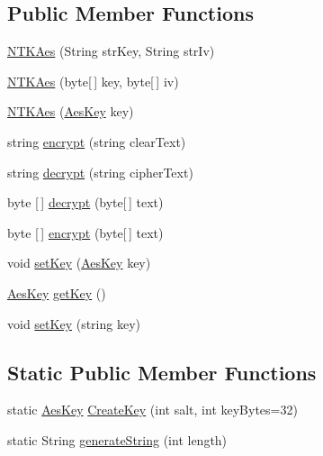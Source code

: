 \subsection*{Public Member Functions}
\begin{DoxyCompactItemize}
\item 
\mbox{\hyperlink{class_n_t_k_1_1_security_1_1_n_t_k_aes_a68f8ea8c2559da1a7d2a3d1677145cd1}{N\+T\+K\+Aes}} (String str\+Key, String str\+Iv)
\item 
\mbox{\hyperlink{class_n_t_k_1_1_security_1_1_n_t_k_aes_a9dca3e66e70f494151ffe863b0e2fd31}{N\+T\+K\+Aes}} (byte\mbox{[}$\,$\mbox{]} key, byte\mbox{[}$\,$\mbox{]} iv)
\item 
\mbox{\hyperlink{class_n_t_k_1_1_security_1_1_n_t_k_aes_a961f23c2649d2f56dedb0db5d9e394db}{N\+T\+K\+Aes}} (\mbox{\hyperlink{struct_n_t_k_1_1_security_1_1_aes_key}{Aes\+Key}} key)
\item 
string \mbox{\hyperlink{class_n_t_k_1_1_security_1_1_n_t_k_aes_aafd754f5643c47dc53dfbf7d482556ce}{encrypt}} (string clear\+Text)
\item 
string \mbox{\hyperlink{class_n_t_k_1_1_security_1_1_n_t_k_aes_a4f70eed096e2d3e59c4a848f66289371}{decrypt}} (string cipher\+Text)
\item 
byte \mbox{[}$\,$\mbox{]} \mbox{\hyperlink{class_n_t_k_1_1_security_1_1_n_t_k_aes_a103d6e749268165cca16c0375497a702}{decrypt}} (byte\mbox{[}$\,$\mbox{]} text)
\item 
byte \mbox{[}$\,$\mbox{]} \mbox{\hyperlink{class_n_t_k_1_1_security_1_1_n_t_k_aes_ad9da3eba89f2724ebe54e63086cee810}{encrypt}} (byte\mbox{[}$\,$\mbox{]} text)
\item 
void \mbox{\hyperlink{class_n_t_k_1_1_security_1_1_n_t_k_aes_a19733b3d2a0c97fdc2a8a86767954cfc}{set\+Key}} (\mbox{\hyperlink{struct_n_t_k_1_1_security_1_1_aes_key}{Aes\+Key}} key)
\item 
\mbox{\hyperlink{struct_n_t_k_1_1_security_1_1_aes_key}{Aes\+Key}} \mbox{\hyperlink{class_n_t_k_1_1_security_1_1_n_t_k_aes_a19ffab44349e954e69e9eb1831c9ceae}{get\+Key}} ()
\item 
void \mbox{\hyperlink{class_n_t_k_1_1_security_1_1_n_t_k_aes_aca17757ef38bf30e088c1b2a2d4f4478}{set\+Key}} (string key)
\end{DoxyCompactItemize}
\subsection*{Static Public Member Functions}
\begin{DoxyCompactItemize}
\item 
static \mbox{\hyperlink{struct_n_t_k_1_1_security_1_1_aes_key}{Aes\+Key}} \mbox{\hyperlink{class_n_t_k_1_1_security_1_1_n_t_k_aes_aa591423c332f2eb8eafe70621cb74eec}{Create\+Key}} (int salt, int key\+Bytes=32)
\item 
static String \mbox{\hyperlink{class_n_t_k_1_1_security_1_1_n_t_k_aes_a72c55f8ff0d45262ff7a38ea756b86e2}{generate\+String}} (int length)
\end{DoxyCompactItemize}
